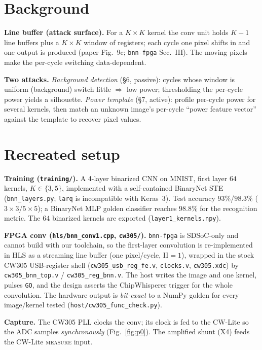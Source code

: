 \documentclass[10pt]{article}
\begin{document}
\section{Background}
\textbf{Line buffer (attack surface).} For a $K\!\times\!K$ kernel the conv unit holds
$K\!-\!1$ line buffers plus a $K\!\times\!K$ window of registers; each cycle one pixel
shifts in and one output is produced (paper Fig.~9c; \texttt{bnn-fpga} Sec.~III). The
moving pixels make the per-cycle switching data-dependent.

\textbf{Two attacks.} \emph{Background detection} (§6, passive): cycles whose window is
uniform (background) switch little $\Rightarrow$ low power; thresholding the per-cycle
power yields a silhouette. \emph{Power template} (§7, active): profile per-cycle power for
several kernels, then match an unknown image's per-cycle ``power feature vector'' against
the template to recover pixel values.

\section{Recreated setup}\label{sec:setup}
\textbf{Training (\texttt{training/}).} A 4-layer binarized CNN on MNIST, first layer
$64$ kernels, $K\!\in\!\{3,5\}$, implemented with a self-contained BinaryNet STE
(\texttt{bnn\_layers.py}; \texttt{larq} is incompatible with Keras~3). Test accuracy
$93\%$/$98.3\%$ ($3\!\times\!3$/$5\!\times\!5$); a BinaryNet MLP golden classifier reaches
$98.8\%$ for the recognition metric. The $64$ binarized kernels are exported
(\texttt{layer1\_kernels.npy}).

\textbf{FPGA conv (\texttt{hls/bnn\_conv1.cpp}, \texttt{cw305/}).} \texttt{bnn-fpga} is
SDSoC-only and cannot build with our toolchain, so the first-layer convolution is
re-implemented in HLS as a streaming line buffer (one pixel/cycle, II$=1$), wrapped in the
stock CW305 USB-register shell (\texttt{cw305\_usb\_reg\_fe.v}, \texttt{clocks.v},
\texttt{cw305.xdc}) by \texttt{cw305\_bnn\_top.v} / \texttt{cw305\_reg\_bnn.v}. The host
writes the image and one kernel, pulses \texttt{GO}, and the design asserts the
ChipWhisperer trigger for the whole convolution. The hardware output is \emph{bit-exact}
to a NumPy golden for every image/kernel tested (\texttt{host/cw305\_func\_check.py}).

\textbf{Capture.} The CW305 PLL clocks the conv; its clock is fed to the CW-Lite so the
ADC samples \emph{synchronously} (Fig.~\ref{fig:p0}). The amplified shunt (X4) feeds the
CW-Lite \textsc{measure} input.
\end{document}
